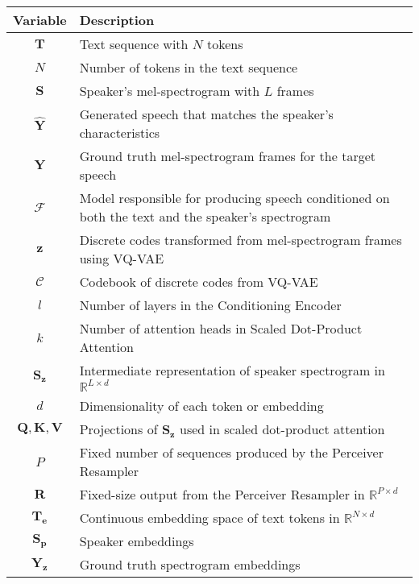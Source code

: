 \begin{table}[H]
\centering

    \begin{tabular}{c|l}
        \hline
        \textbf{Variable} & \textbf{Description} \\ \hline
        \( \mathbf{T} \) & Text sequence with \( N \) tokens \\ \hline
        \( N \) & Number of tokens in the text sequence \\ \hline
        \( \mathbf{S} \) & Speaker's mel-spectrogram with \( L \) frames \\ \hline
        \( \hat{\mathbf{Y}} \) & Generated speech that matches the speaker's characteristics \\ \hline
        \( \mathbf{Y} \) & Ground truth mel-spectrogram frames for the target speech \\ \hline
        \( \mathcal{F} \) & Model responsible for producing speech conditioned on both the text and the speaker's spectrogram \\ \hline
        \( \mathbf{z} \) & Discrete codes transformed from mel-spectrogram frames using VQ-VAE \\ \hline
        \( \mathcal{C} \) & Codebook of discrete codes from VQ-VAE \\ \hline
        \( l \) & Number of layers in the Conditioning Encoder \\ \hline
        \( k \) & Number of attention heads in Scaled Dot-Product Attention \\ \hline
        \( \mathbf{S_z} \) & Intermediate representation of speaker spectrogram in \( \mathbb{R}^{L \times d} \) \\ \hline
        \( d \) & Dimensionality of each token or embedding \\ \hline
        \( \mathbf{Q}, \mathbf{K}, \mathbf{V} \) & Projections of \( \mathbf{S_z} \) used in scaled dot-product attention \\ \hline
        \( P \) & Fixed number of sequences produced by the Perceiver Resampler \\ \hline
        \( \mathbf{R} \) & Fixed-size output from the Perceiver Resampler in \( \mathbb{R}^{P \times d} \) \\ \hline
        \( \mathbf{T_e} \) & Continuous embedding space of text tokens in \( \mathbb{R}^{N \times d} \) \\ \hline
        \( \mathbf{S_p} \) & Speaker embeddings \\ \hline
        \( \mathbf{Y_z} \) & Ground truth spectrogram embeddings \\ \hline

\end{tabular}
\end{table}
